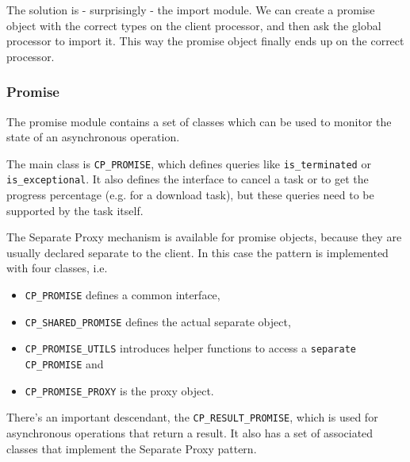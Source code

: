 The solution is - surprisingly - the import module.
We can create a promise object with the correct types on the client processor, and then ask the global processor to import it.
This way the promise object finally ends up on the correct processor.

% 

\subsubsection{Promise}
\label {sec:promise}

The promise module contains a set of classes which can be used to monitor the state of an asynchronous operation.

The main class is \lstinline!CP_PROMISE!, which defines queries like \lstinline!is_terminated! or \lstinline!is_exceptional!.
It also defines the interface to cancel a task or to get the progress percentage (e.g. for a download task), but these queries need to be supported by the task itself.

The Separate Proxy mechanism is available for promise objects, because they are usually declared separate to the client.
In this case the pattern is implemented with four classes, i.e.
\begin{itemize}
 \item \lstinline!CP_PROMISE! defines a common interface,
 \item \lstinline!CP_SHARED_PROMISE! defines the actual separate object,
 \item \lstinline!CP_PROMISE_UTILS! introduces helper functions to access a \lstinline!separate! \lstinline!CP_PROMISE! and
 \item \lstinline!CP_PROMISE_PROXY! is the proxy object.
\end{itemize}

There's an important descendant, the \lstinline!CP_RESULT_PROMISE!, which is used for asynchronous operations that return a result.
It also has a set of associated classes that implement the Separate Proxy pattern.

